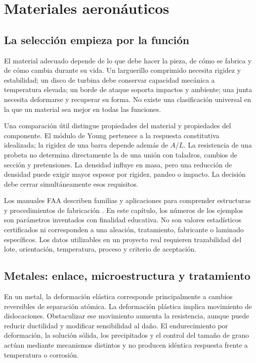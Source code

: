 \chapter{Materiales aeronáuticos}\label{ch:17}

\section{La selección empieza por la función}
El material adecuado depende de lo que debe hacer la pieza, de cómo se fabrica y de cómo cambia durante su vida. Un larguerillo comprimido necesita rigidez y estabilidad; un disco de turbina debe conservar capacidad mecánica a temperatura elevada; un borde de ataque soporta impactos y ambiente; una junta necesita deformarse y recuperar su forma. No existe una clasificación universal en la que un material sea mejor en todas las funciones.

Una comparación útil distingue propiedades del material y propiedades del componente. El módulo de Young pertenece a la respuesta constitutiva idealizada; la rigidez de una barra depende además de $A/L$. La resistencia de una probeta no determina directamente la de una unión con taladros, cambios de sección y pretensiones. La densidad influye en masa, pero una reducción de densidad puede exigir mayor espesor por rigidez, pandeo o impacto. La decisión debe cerrar simultáneamente esos requisitos.

Los manuales FAA describen familias y aplicaciones para comprender estructuras y procedimientos de fabricación \cite{FAA-AIRFRAME}. En este capítulo, los números de los ejemplos son parámetros inventados con finalidad educativa. No son valores estadísticos certificados ni corresponden a una aleación, tratamiento, fabricante o laminado específicos. Los datos utilizables en un proyecto real requieren trazabilidad del lote, orientación, temperatura, proceso y criterio de aceptación.


\section{Metales: enlace, microestructura y tratamiento}
En un metal, la deformación elástica corresponde principalmente a cambios reversibles de separación atómica. La deformación plástica implica movimiento de dislocaciones. Obstaculizar ese movimiento aumenta la resistencia, aunque puede reducir ductilidad y modificar sensibilidad al daño. El endurecimiento por deformación, la solución sólida, los precipitados y el control del tamaño de grano actúan mediante mecanismos distintos y no producen idéntica respuesta frente a temperatura o corrosión.

